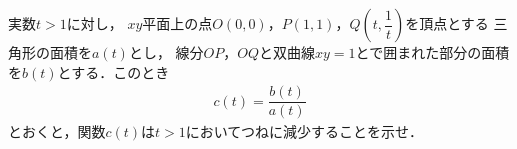 \documentclass[../../main.tex]{subfiles}
\begin{document}
実数$t>1$に対し，
$xy$平面上の点$O(0,0)$，$P(1,1)$，$\displaystyle Q \left( t,\dfrac{1}{t} \right)$を頂点とする
三角形の面積を$a(t)$とし，
線分$OP$，$OQ$と双曲線$xy=1$とで囲まれた部分の面積を$b(t)$とする．このとき
\begin{align*}
  c(t)=\dfrac{b(t)}{a(t)}
\end{align*}
とおくと，関数$c(t)$は$t>1$においてつねに減少することを示せ．
\end{document}
